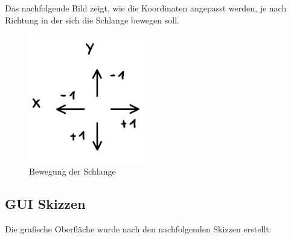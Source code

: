 \documentclass[a4paper,10pt]{article}
\begin{document}
			Das nachfolgende Bild zeigt, wie die Koordinaten angepasst werden, 
			je nach Richtung in der sich die Schlange bewegen soll.\\
			\begin{figure}[h]
				\centering
				\includegraphics[width=0.45\textwidth]{richtung}
				\caption{Bewegung der Schlange}
				\label{move}
			\end{figure}
			\newpage
		\subsection{GUI Skizzen}
			Die grafische Oberfläche wurde nach den nachfolgenden Skizzen 
			erstellt:\\
		
\end{document}
